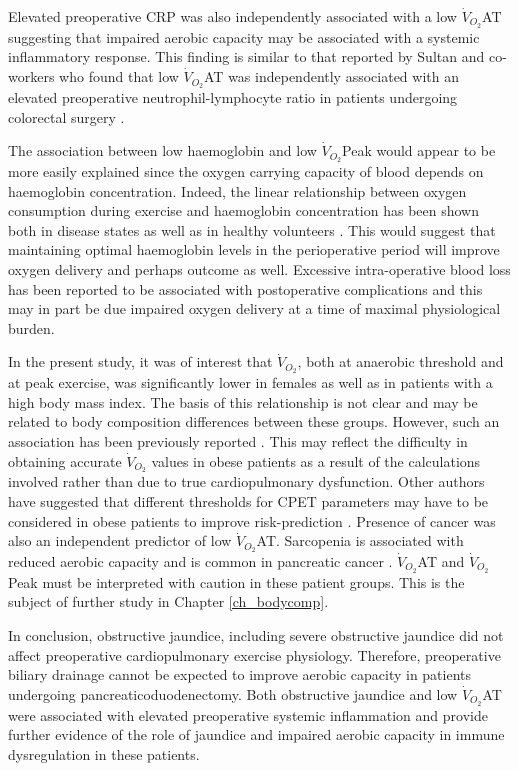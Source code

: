 Elevated preoperative CRP was also independently associated with a low $\dot{V}_{O_2}$AT suggesting that impaired aerobic capacity may be associated with a systemic inflammatory response.
This finding is similar to that reported by Sultan and co-workers who found that low $\dot{V}_{O_2}$AT was independently associated with an elevated preoperative neutrophil-lymphocyte ratio in patients undergoing colorectal surgery \parencite{sultan_cardiopulmonary_2014}.

The association between low haemoglobin and low $\dot{V}_{O_2}$Peak would appear to be more easily explained since the oxygen carrying capacity of blood depends on haemoglobin concentration.  
Indeed, the linear relationship between oxygen consumption during exercise and haemoglobin concentration has been shown both in disease states \parencite{agostoni_relationship_2010} as well as in healthy volunteers \parencite{dellweg_cardiopulmonary_2008}.
This would suggest that maintaining optimal haemoglobin levels in the perioperative period will improve oxygen delivery and perhaps outcome as well. 
Excessive intra-operative blood loss has been reported to be associated with postoperative complications \parencite{pratt_risk_2008} and this may in part be due impaired oxygen delivery at a time of maximal physiological burden.

In the present study, it was of interest that $\dot{V}_{O_2}$, both at anaerobic threshold and at peak exercise, was significantly lower in females as well as in patients with  a high body mass index.
The basis of this relationship is not clear and may be related to body composition differences between these groups.
However, such an association has been previously reported \parencite{horwich_relationship_2009}.
This may reflect the difficulty in obtaining accurate $\dot{V}_{O_2}$ values in obese patients as a result of the calculations involved rather than due to true cardiopulmonary dysfunction. 
Other authors have suggested that different thresholds for CPET parameters may have to be considered in obese patients to improve risk-prediction \parencite{donnelly_criteria_1990,hulens_exercise_2001}.
Presence of cancer was also an independent predictor of low $\dot{V}_{O_2}$AT.
Sarcopenia is associated with reduced aerobic capacity \parencite{evans_sarcopenia_1993} and is common in pancreatic cancer \parencite{joglekar_sarcopenia_2015}.
$\dot{V}_{O_2}$AT and $\dot{V}_{O_2}$Peak must be interpreted with caution in these patient groups.
This is the subject of further study in Chapter \ref{ch_bodycomp}.

In conclusion, obstructive jaundice, including severe obstructive jaundice did not affect preoperative cardiopulmonary exercise physiology. 
Therefore, preoperative biliary drainage cannot be expected to improve aerobic capacity in patients undergoing pancreaticoduodenectomy.
Both obstructive jaundice and low $\dot{V}_{O_2}$AT were associated with elevated preoperative systemic inflammation and provide further evidence of the role of jaundice and impaired aerobic capacity in immune dysregulation in these patients.
